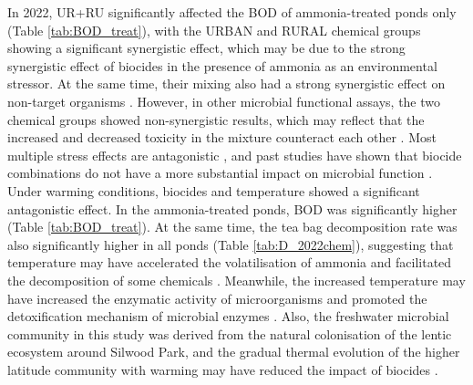 \documentclass[11pt, a4paper]{article}
\begin{document}
\begin{spacing}{1.5}
In 2022, UR+RU significantly affected the BOD of ammonia-treated ponds only (Table \ref{tab:BOD_treat}), with the URBAN and RURAL chemical groups showing a significant synergistic effect, which may be due to the strong synergistic effect of biocides in the presence of ammonia as an environmental stressor. At the same time, their mixing also had a strong synergistic effect on non-target organisms \citep{shahid2019environmental}. However, in other microbial functional assays, the two chemical groups showed non-synergistic results, which may reflect that the increased and decreased toxicity in the mixture counteract each other \citep{deneer2000toxicity}. Most multiple stress effects are antagonistic \citep{folt1999synergism}, and past studies have shown that biocide combinations do not have a more substantial impact on microbial function \citep{hoagland1993freshwater,rossi2018interactive}. Under warming conditions, biocides and temperature showed a significant antagonistic effect. In the ammonia-treated ponds, BOD was significantly higher (Table \ref{tab:BOD_treat}). At the same time, the tea bag decomposition rate was also significantly higher in all ponds (Table \ref{tab:D_2022chem}), suggesting that temperature may have accelerated the volatilisation of ammonia and facilitated the decomposition of some chemicals \citep{op2017negative}. Meanwhile, the increased temperature may have increased the enzymatic activity of microorganisms and promoted the detoxification mechanism of microbial enzymes \citep{chaloupka1985temperature}. Also, the freshwater microbial community in this study was derived from the natural colonisation of the lentic ecosystem around Silwood Park, and the gradual thermal evolution of the higher latitude community with warming may have reduced the impact of biocides \citep{de2013latitudinal}.


\end{spacing}
\end{document}
